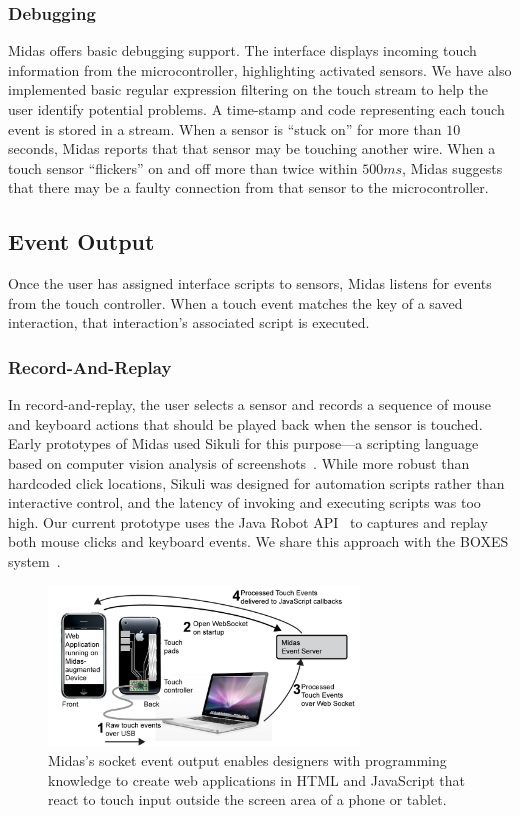 \subsubsection{Debugging}

Midas offers basic debugging support. The interface displays incoming touch information from the microcontroller, highlighting activated sensors.  We have also implemented basic regular expression filtering on the touch stream to help the user identify potential problems.  A time-stamp and code representing each touch event is stored in a stream.  When a sensor is ``stuck on'' for more than $10$ seconds, Midas reports that that sensor may be touching another wire.  When a touch sensor ``flickers'' on and off more than twice within $500ms$, Midas suggests that there may be a faulty connection from that sensor to the microcontroller.

\subsection{Event Output}
Once the user has assigned interface scripts to sensors, Midas listens for events from the touch controller. When a touch event matches the key of a saved interaction, that interaction's associated script is executed.

\subsubsection{Record-And-Replay}

In record-and-replay, the user selects a sensor and records a sequence of mouse and keyboard actions that should be played back when the sensor is touched. Early prototypes of Midas used Sikuli for this purpose---a scripting language based on computer vision analysis of screenshots~\cite{yeh-sikuli}. While more robust than hardcoded click locations, Sikuli was designed for automation scripts rather than interactive control, and the latency of invoking and executing scripts was too high. Our current prototype uses the Java Robot API~\cite{robots} to captures and replay both mouse clicks and keyboard events. We share this approach with the BOXES system~\cite{hudson-boxes}.

\begin{figure}[b]
\centering
\includegraphics[width=3.25in]{figures/midas/socket-events.png}
\caption{Midas's socket event output enables designers with programming knowledge to create web applications in HTML and JavaScript that react to touch input outside the screen area of a phone or tablet.} 
\label{fig:midas-socket}
\end{figure}

